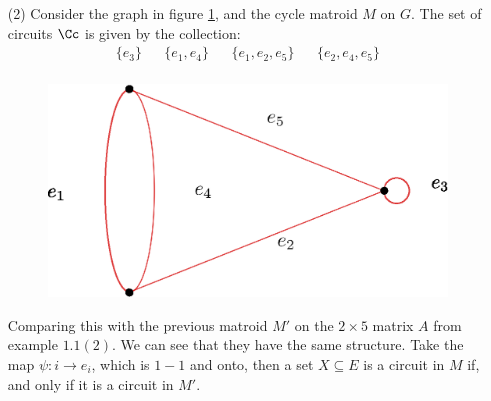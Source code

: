 \begin{example}
\begin{enumerate}
        \item[(2)] Consider the graph in figure \ref{fig_1.2}, and the cycle
            matroid $M$ on $G$. The set of circuits  $\Cc$ is given by the
            collection:
            \begin{align*}
                \{e_3\} && \{e_1,e_4\} && \{e_1, e_2, e_5\} && \{e_2,e_4,e_5\} \\
            \end{align*}
            \begin{figure}[h]
                \centering
                \includegraphics[scale=0.5]{Figures/chapter1/graphic_matroid.eps}
                \caption{}
                \label{fig_1.2}
            \end{figure}
            Comparing this with the previous matroid $M'$ on the $2 \times 5$
            matrix $A$ from example $1.1(2)$. We can see that they have the same
            structure. Take the map $\psi:i \rightarrow e_i$, which is $1-1$ and
             onto, then a set  $X \subseteq E$ is a circuit in  $M$ if, and only
             if it is a circuit in $M'$.
    \end{enumerate}
\end{example}

